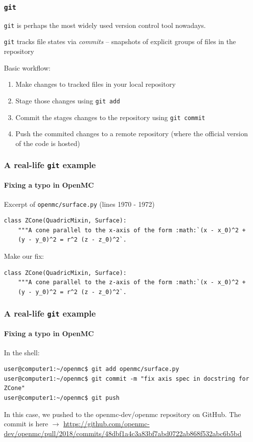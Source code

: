 \begin{frame}[fragile]
    \frametitle{\verb:git:}
    \verb:git: is perhaps the most widely used version control tool nowadays.

    \verb:git: tracks file states via {\it commits} -- snapshots of explicit groups of files in the repository

    Basic workflow:
    \begin{enumerate}
        \item Make changes to tracked files in your local repository
        \item Stage those changes using \verb:git add:
        \item Commit the stages changes to the repository using \verb:git commit:
        \item Push the commited changes to a remote repository (where the official version of the code is hosted)
    \end{enumerate}

\end{frame}

\begin{frame}[fragile]
    \frametitle{A real-life \verb:git: example}
    \framesubtitle{Fixing a typo in OpenMC}

    Excerpt of \verb:openmc/surface.py: (lines 1970 - 1972)

    \begin{verbatim}
class ZCone(QuadricMixin, Surface):
    """A cone parallel to the x-axis of the form :math:`(x - x_0)^2 + 
    (y - y_0)^2 = r^2 (z - z_0)^2`.
    \end{verbatim}

    Make our fix:

    \begin{verbatim}
class ZCone(QuadricMixin, Surface):
    """A cone parallel to the z-axis of the form :math:`(x - x_0)^2 + 
    (y - y_0)^2 = r^2 (z - z_0)^2`.
    \end{verbatim}
\end{frame}

\begin{frame}[fragile]
    \frametitle{A real-life \verb:git: example}
    \framesubtitle{Fixing a typo in OpenMC}

    In the shell:

    \begin{verbatim}
user@computer1:~/openmc$ git add openmc/surface.py
user@computer1:~/openmc$ git commit -m "fix axis spec in docstring for ZCone"
user@computer1:~/openmc$ git push
    \end{verbatim}

    In this case, we pushed to the openmc-dev/openmc repository on GitHub. The commit is here $\rightarrow$ \url{https://github.com/openmc-dev/openmc/pull/2018/commits/48dbf1a4c3a83bf7abd0722ab868f532abc6b5bd} 
\end{frame}
